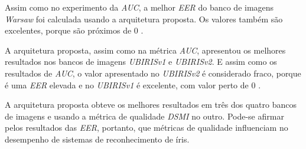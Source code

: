 \par Assim como no experimento da \textit{\acrshort{AUC}}, a melhor \textit{\acrshort{EER}} do banco de imagens \textit{\acrshort{Warsaw}} foi calculada usando a arquitetura proposta. Os valores também são excelentes, porque são próximos de 0 \cite{eer, d33BEAT}.


\par A arquitetura proposta, assim como na métrica \textit{\acrshort{AUC}}, apresentou os melhores resultados nos bancos de imagens \textit{UBIRISv1} e \textit{UBIRISv2}. E assim como os resultados de \textit{\acrshort{AUC}}, o valor apresentado no \textit{UBIRISv2} é considerado fraco, porque é uma \textit{\acrshort{EER}} elevada e no \textit{UBIRISv1} é excelente, com valor perto de 0 \cite{eer, d33BEAT}.

\par A arquitetura proposta obteve os melhores resultados em três dos quatro bancos de imagens e usando a métrica de qualidade \textit{\acrshort{DSMI}} no outro. Pode-se afirmar pelos resultados das \textit{\acrshort{EER}}, portanto, que métricas de qualidade influenciam no desempenho de sistemas de reconhecimento de íris.

